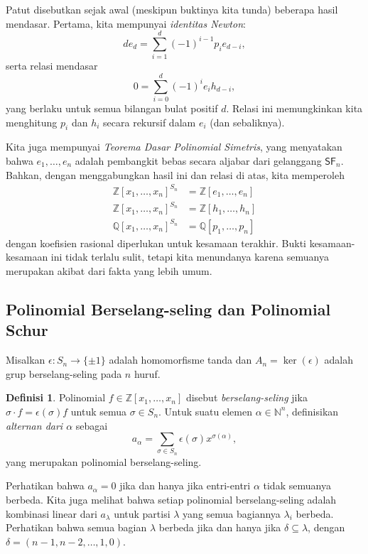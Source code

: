 \documentclass[12pt]{article}
\theoremstyle{plain}
\theoremstyle{definition}
\newtheorem{definition}[theorem]{Definisi}
\theoremstyle{remark}
\numberwithin{equation}{section}
\begin{document}
Patut disebutkan sejak awal (meskipun buktinya kita tunda)
beberapa hasil mendasar. Pertama, kita mempunyai \emph{identitas Newton}:
\[
de_d = \sum_{i=1}^d (-1)^{i-1} p_i e_{d-i} ,
\]
serta relasi mendasar
\[
0 = \sum_{i=0}^d (-1)^i e_i h_{d-i},
\]
yang berlaku untuk semua bilangan bulat positif $d$.
Relasi ini memungkinkan kita menghitung $p_i$ dan $h_i$ secara rekursif dalam
$e_i$ (dan sebaliknya).

Kita juga mempunyai \emph{Teorema Dasar Polinomial
Simetris}, yang menyatakan bahwa $e_1,\ldots,e_n$ adalah pembangkit bebas secara aljabar
dari gelanggang $\mathsf{SF}_n$.
Bahkan, dengan menggabungkan hasil ini dan relasi di atas, kita memperoleh
\begin{align*}
\mathbb{Z}[x_1,\ldots,x_n]^{S_n} &= \mathbb{Z}[e_1,\ldots,e_n]\\
\mathbb{Z}[x_1,\ldots,x_n]^{S_n} &= \mathbb{Z}[h_1,\ldots,h_n]\\
\mathbb{Q}[x_1,\ldots,x_n]^{S_n} &= \mathbb{Q}[p_1,\ldots,p_n]
\end{align*}
dengan koefisien rasional diperlukan untuk kesamaan terakhir.
Bukti kesamaan-kesamaan ini tidak terlalu sulit, tetapi kita menundanya
karena semuanya merupakan akibat dari fakta yang lebih umum.

\subsection{Polinomial Berselang-seling dan Polinomial Schur}

Misalkan $\epsilon : S_n \to \{\pm 1\}$ adalah homomorfisme tanda
dan $A_n = \ker(\epsilon)$ adalah grup berselang-seling pada $n$ huruf.

\begin{definition}
Polinomial $f \in \mathbb{Z}[x_1,\ldots,x_n]$ disebut \emph{berselang-seling} jika
$\sigma \cdot f = \epsilon(\sigma)f$ untuk semua $\sigma \in S_n$.
Untuk suatu elemen $\alpha \in \mathbb{N}^n$, definisikan \emph{alternan
dari $\alpha$} sebagai
\[
a_\alpha = \sum_{\sigma \in S_n} \epsilon(\sigma) x^{\sigma(\alpha)},
\]
yang merupakan polinomial berselang-seling.
\end{definition}

Perhatikan bahwa $a_\alpha=0$ jika dan hanya jika entri-entri $\alpha$
tidak semuanya berbeda. Kita juga melihat bahwa setiap polinomial berselang-seling
adalah kombinasi
linear dari $a_\lambda$ untuk partisi $\lambda$ yang semua bagiannya
$\lambda_i$ berbeda.
Perhatikan bahwa semua bagian $\lambda$ berbeda jika dan hanya jika
$\delta \subseteq \lambda$, dengan
$\delta=(n-1,n-2,\ldots,1,0)$.
\end{document}
